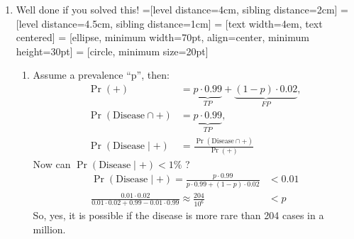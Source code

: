 \documentclass[12pt,a4paper,twoside]{article}
\begin{document}
\begin{enumerate}[label=\bfseries Q\arabic*.]
\item %
  Well done if you solved this!
  =[level distance=4cm, sibling distance=2cm]
  =[level distance=4.5cm, sibling distance=1cm]
   = [text width=4em, text centered]
   = [ellipse, minimum width=70pt, align=center, minimum height=30pt]
   = [circle, minimum size=20pt]
  
  
  \begin{enumerate}
  \item Assume a prevalence ``p'', then: %
    \begin{align*}
      \Pr(+) &= \underbrace{p \cdot 0.99}_{TP} + 
               \underbrace{(1-p) \cdot 0.02}_{FP},\\
      \Pr(\text{Disease} \cap +) &= \underbrace{p \cdot 0.99}_{TP},\\
      \Pr(\text{Disease} \mid +) &= \frac{\Pr(\text{Disease} \cap+)}
                                   {\Pr(+)}
    \end{align*}
    Now can $\Pr(\text{Disease} \mid +) < 1\%$ ?
    \begin{align*}
      \Pr(\text{Disease} \mid +) = \frac{p \cdot 0.99}{p \cdot 0.99 + (1-p) \cdot 0.02} &< 0.01\\
      \frac{0.01 \cdot 0.02}{0.01 \cdot 0.02 + 0.99 - 0.01 \cdot
      0.99} \approx  \frac{204}{10^{6}} &< p
    \end{align*}
    So, yes, it is possible if the disease is more rare than 204 cases
    in a million.


\end{enumerate}
\end{enumerate}
\end{document}
